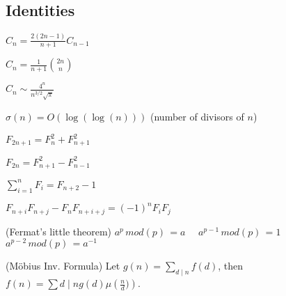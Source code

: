 \subsection{Identities}
{
	$C_n = \frac{2(2n-1)}{n+1} C_{n-1}$

	$C_n = \frac{1}{n+1} \binom{2n}{n}$

	$C_n \sim \frac{4^n}{n^{3/2}\sqrt{\pi}}$

	$\sigma(n) = O(\log(\log(n)))$ (number of divisors of $n$)

	$F_{2n+1} = F_{n}^2 + F_{n+1}^2$

	$F_{2n} = F_{n+1}^2 - F_{n-1}^2$

	$\sum_{i=1}^n F_i = F_{n+2}-1$

	$F_{n+i}F_{n+j} - F_nF_{n+i+j} = (-1)^n F_iF_j$

    (Fermat's little theorem)
    $a^{p}\,mod(p)\,= a\quad$
    $a^{p-1}\,mod(p)\,=1\quad$
    $a^{p-2}\,mod(p)\,=a^{-1}$

	(Möbius Inv. Formula)
	Let $g(n) = \sum_{d\mid n} f(d)$, then $f(n)=\sum{d\mid n} g(d) \mu\left(\frac{n}{d})\right)$.
}
